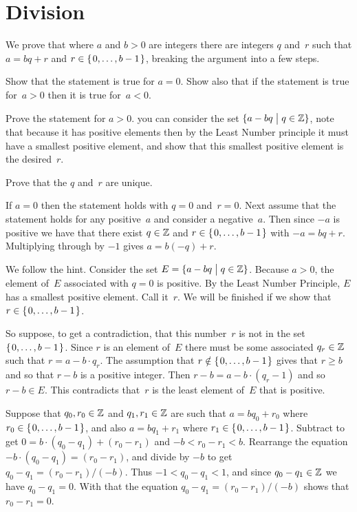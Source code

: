 \documentclass{ibl}  %
\begin{document}
\section{Division}
\begin{ex}  We prove that 
where $a$ and $b>0$ are integers there are integers $q$ and~$r$
such that $a=bq+r$ and $r\in\mbox{$\{\hspace{0.1em}0,\ldots,b-1\hspace{0.1em}\}$}$,
breaking the argument into a few steps.
\begin{exes} 
\item Show that the statement is true for $a=0$.
  Show also that if the statement is true for~$a>0$ then it is true
  for~$a<0$. 
\item Prove the statement for $a>0$.
  \hint you can consider the set $\{a-bq \bigm| q\in\mathbb{Z}\}$, note that
  because it has positive elements then by the Least Number principle
  it must have a smallest positive
  element, and show that this smallest positive element is the desired~$r$.
\item
  Prove that the $q$ and~$r$ are unique.
\end{exes}
\begin{ans}
\begin{exes}
\item
  If $a=0$ then the statement holds with $q=0$ and~$r=0$.
  Next assume that the statement holds for any positive~$a$ 
  and consider a negative~$a$.
  Then since $-a$ is positive we have that there exist 
  $q\in\mathbb{Z}$ and $r\in\mbox{$\{\hspace{0.1em}0,\ldots,b-1\hspace{0.1em}\}$}$ with $-a=bq+r$.
  Multiplying through by $-1$ gives $a=b(-q)+r$.
\item We follow the hint.
  Consider the set $E=\{a-bq \bigm| q\in\mathbb{Z}\}$.
  Because $a>0$, the element of~$E$ associated with $q=0$ is positive.
  By the Least Number Principle, $E$ has a smallest positive element.
  Call it~$r$.
  We will be finished if we show that~$r\in\mbox{$\{\hspace{0.1em}0, \ldots , b-1\hspace{0.1em}\}$}$.

  So suppose, to get a contradiction, that this number~$r$ is not in the set 
  $\mbox{$\{\hspace{0.1em}0, \ldots , b-1\hspace{0.1em}\}$}$.
  Since $r$ is an element of~$E$ there must be some associated
  $q_r\in\mathbb{Z}$ such that $r=a-b\cdot q_r$.
  The assumption that $r\notin\mbox{$\{\hspace{0.1em}0, \ldots , b-1\hspace{0.1em}\}$}$ gives that $r\geq b$
  and so that $r-b$ is a positive integer.
  Then $r-b=a-b\cdot (q_r-1)$ and so $r-b\in E$.
  This contradicts that~$r$ is the least element of~$E$ that is positive.
\item Suppose that $q_0,r_0\in\mathbb{Z}$ and $q_1,r_1\in\mathbb{Z}$ are such that
  $a=bq_0+r_0$ where $r_0\in\mbox{$\{\hspace{0.1em}0, \ldots, b-1\hspace{0.1em}\}$}$, and also
  $a=bq_1+r_1$ where $r_1\in\mbox{$\{\hspace{0.1em}0, \ldots, b-1\hspace{0.1em}\}$}$.
  Subtract to get $0=b\cdot(q_0-q_1)+(r_0-r_1)$ and $-b<r_0-r_1<b$.
  Rearrange the equation $-b\cdot(q_0-q_1)=(r_0-r_1)$,
  and divide by $-b$ to get $q_0-q_1=(r_0-r_1)/(-b)$.
  Thus  $-1<q_0-q_1<1$, and since $q_0-q_1\in\mathbb{Z}$ we have $q_0-q_1=0$.
  With that the equation $q_0-q_1=(r_0-r_1)/(-b)$ shows that $r_0-r_1=0$.
\end{exes}
\end{ans}
\end{ex}
\end{document}
